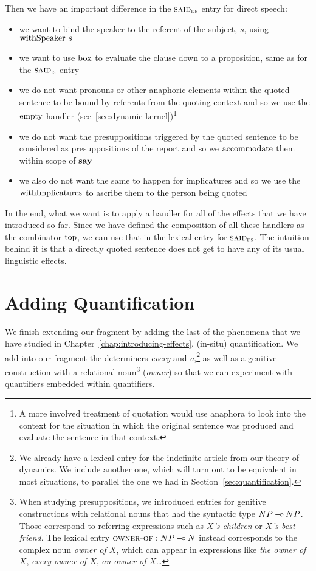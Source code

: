Then we have an important difference in the $\textsc{said}_{\textsc{ds}}$ entry
for direct speech:

\begin{itemize}
\item we want to bind the speaker to the referent of the subject, $s$,
  using $\operatorname{withSpeaker}\,s$
\item we want to use $\mathrm{box}$ to evaluate the clause down to a proposition,
  same as for the $\textsc{said}_{\textsc{is}}$ entry
\item we do not want pronouns or other anaphoric elements within the quoted
  sentence to be bound by referents from the quoting context and so we use
  the $\operatorname{empty}$ handler (see~\ref{sec:dynamic-kernel})\footnote{A more
    involved treatment of quotation would use anaphora to look into the
    context for the situation in which the original sentence was produced
    and evaluate the sentence in that context.}
\item we do not want the presuppositions triggered by the quoted sentence
  to be considered as presuppositions of the report and so we
  $\operatorname{accommodate}$ them within scope of $\textbf{say}$
\item we also do not want the same to happen for implicatures and so we use
  the $\operatorname{withImplicatures}$ to ascribe them to the person being quoted
\end{itemize}

In the end, what we want is to apply a handler for all of the effects that
we have introduced so far. Since we have defined the composition of all
these handlers as the combinator $\mathrm{top}$, we can use that in the lexical
entry for $\textsc{said}_{\textsc{ds}}$. The intuition behind it is that a
directly quoted sentence does not get to have any of its usual linguistic
effects.


\section{Adding Quantification}
\label{sec:adding-quantification}

We finish extending our fragment by adding the last of the phenomena that
we have studied in Chapter~\ref{chap:introducing-effects}, (in-situ)
quantification. We add into our fragment the determiners \emph{every} and
\emph{a},\footnote{We already have a lexical entry for the indefinite
  article from our theory of dynamics. We include another one, which will
  turn out to be equivalent in most situations, to parallel the one we had
  in Section~\ref{sec:quantification}.} as well as a genitive construction
with a relational noun\footnote{When studying presuppositions, we
  introduced entries for genitive constructions with relational nouns that
  had the syntactic type $NP \mathbin{{-}\mkern-3.5mu{\circ}} NP$. Those correspond to referring
  expressions such as \emph{$X$'s children} or \emph{$X$'s best
    friend}. The lexical entry $\textsc{owner-of} : NP \mathbin{{-}\mkern-3.5mu{\circ}} N$ instead
  corresponds to the complex noun \emph{owner of $X$}, which can appear in
  expressions like \emph{the owner of $X$}, \emph{every owner of $X$},
  \emph{an owner of $X$}\ldots} (\emph{owner}) so that we can experiment
with quantifiers embedded within quantifiers.

